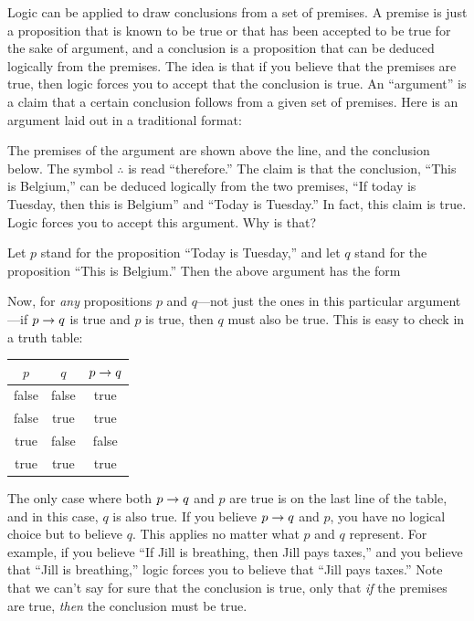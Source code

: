 Logic can be applied to draw conclusions from a set of premises.
A premise is just a proposition that is known to be true or that
has been accepted to be true for the sake of argument, and a conclusion
is a proposition that can be deduced logically from the premises.
The idea is that if you believe that the premises are true,
then logic forces you to accept that the conclusion is true.
An ``argument'' is a claim that a certain conclusion follows from
a given set of premises.  Here is an argument laid out in
a traditional format:
\begin{center}
\end{center}
The premises of the argument are shown above the line, and the conclusion
below.  The symbol $\therefore$ is read ``therefore.''  The claim is that
the conclusion, ``This is Belgium,'' can be deduced logically from the two
premises, ``If today is Tuesday, then this is Belgium'' and ``Today is Tuesday.''
In fact, this claim is true.  Logic forces you to accept this argument.
Why is that?

Let $p$ stand for the proposition ``Today is Tuesday,'' and let $q$ stand for the
proposition ``This is Belgium.''  Then the above argument has the form
\begin{center}
\end{center}
Now, for \emph{any} propositions $p$ and $q$---not just the ones in this particular
argument---if $p\rightarrow q$ is true and $p$ is true, then $q$ must also be true.
This is easy to check in a truth table:
\begin{center}
  \begin{tabular}{|c|c|c|}
     \hline
     \strut $p$&    $q$&    $p\rightarrow q$\\
     \hline
     false&  false&  true\\
     false&  true&   true\\
     true&   false&  false\\
     true&   true&   true\\
     \hline
  \end{tabular}
\end{center}
The only case where both $p\rightarrow q$ and $p$ are true is on
the last line of the table, and in this case, $q$ is also true.
If you believe
$p\rightarrow q$ and $p$, you have no logical choice but to believe $q$.
This applies no matter what $p$ and $q$ represent.  For example,
if you believe ``If Jill is breathing, then Jill pays taxes,'' 
and you believe that ``Jill is breathing,'' logic forces you to believe that
``Jill pays taxes.''  Note that we can't say for sure that the
conclusion is true, only that \emph{if} the premises are true,
\emph{then} the conclusion must be true.

